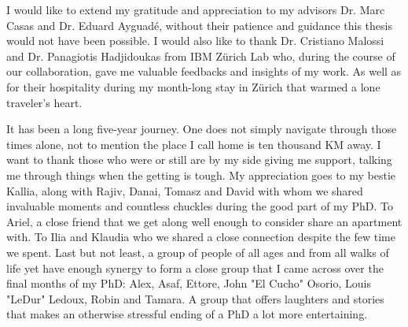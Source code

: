 
\begin{acknowledgements}
	I would like to extend my gratitude and appreciation to my advisors Dr. Marc
	Casas and Dr. Eduard Ayguad\'{e}, without their patience and guidance this
	thesis would not have been possible. I would also like to thank Dr.
	Cristiano Malossi and Dr. Panagiotis Hadjidoukas from IBM Z\"{u}rich Lab
	who, during the course of our collaboration, gave me valuable feedbacks and
	insights of my work. As well as for their hospitality during my month-long
	stay in Z\"{u}rich that warmed a lone traveler's heart.

	It has been a long five-year journey. One does not simply navigate through
	those times alone, not to mention the place I call home is ten thousand KM
	away. I want to thank those who were or still are by my side giving me
	support, talking me through things when the getting is tough. My
	appreciation goes to my bestie Kallia, along with Rajiv, Danai, Tomasz and
	David with whom we shared invaluable moments and countless chuckles during
	the good part of my PhD. To Ariel, a close friend that we get along well enough
	to consider share an apartment with. To Ilia and Klaudia who we shared a close
	connection despite the few time we spent. Last but not least, a group of
	people of all ages and from all walks of life yet have enough synergy to
	form a close group that I came across over the final months of my PhD: Alex,
	Asaf, Ettore, John "El Cucho" Osorio, Louis "LeDur" Ledoux, Robin and
	Tamara. A group that offers laughters and stories that makes an otherwise
	stressful ending of a PhD a lot more entertaining.	

\end{acknowledgements}
